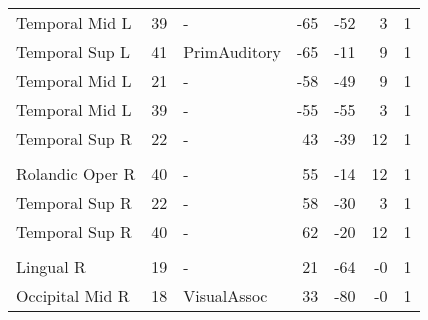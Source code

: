 \begin{table}
\begin{ThreePartTable}
\begin{tabularx}{\textwidth}{A{4cm} l L *{3}{r} *{1}{R}}
\toprule
{} \\
\midrule
Temporal Mid L & 39 & - & -65 & -52 & 3 & 1 \\
Temporal Sup L & 41 & PrimAuditory & -65 & -11 & 9 & 1 \\
Temporal Mid L & 21 & - & -58 & -49 & 9 & 1 \\
Temporal Mid L & 39 & - & -55 & -55 & 3 &  1 \\
Temporal Sup R & 22 & - & 43 & -39 & 12 &  1 \\
\toprule
{}\\
\midrule
Rolandic Oper R & 40 & - & 55 & -14 & 12 &  1 \\
Temporal Sup R & 22 & - & 58 & -30 & 3 &  1 \\
Temporal Sup R & 40 & - & 62 & -20 & 12 &  1 \\

\toprule
{} \\
\midrule
Lingual R & 19 & - & 21 & -64 & -0 &  1 \\
Occipital Mid R & 18 & VisualAssoc & 33 & -80 & -0 &  1 \\

\bottomrule
    \end{tabularx}
\end{ThreePartTable}
\caption[ F-test Significant Voxels]{\label{tab:Ftest}}
\end{table}